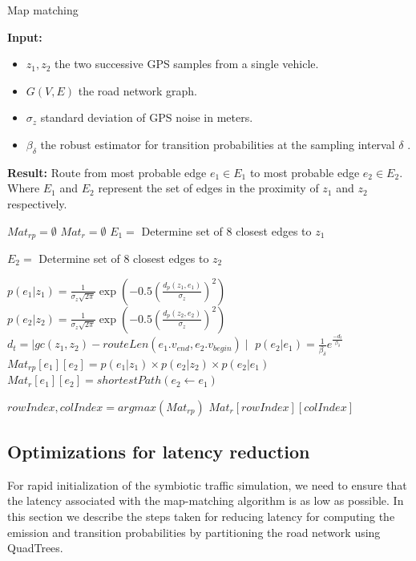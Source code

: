 \documentclass{wscpaperproc}
\theoremstyle{wsc}
\begin{document}
\begin{algorithm}[h]
\caption{Map matching}
\label{algo:map-matching-algo}
{\bf Input: }
\begin{itemize}
\item $z_{1},z_{2}$ the two successive GPS samples from a single vehicle.
\item $G(V,E)$ the road network graph.
\item $\sigma_{z}$ standard deviation of GPS noise in meters.
\item $\beta_{\delta}$ the robust estimator for transition probabilities at the sampling interval $\delta$ .

\end{itemize}
{\bf Result: }Route from most probable edge $e_{1}\in E_{1}$ to most probable edge $e_{2}\in E_{2}$. Where $E_{1}$ and $E_{2}$ represent the set of edges in the proximity of $z_{1}$ and $z_{2}$ respectively.
\begin{algorithmic}[1]
\State $Mat_{rp}=\emptyset$
\State $Mat_{r}=\emptyset$
\State $E_{1}=$ Determine set of 8 closest edges to $z_{1}$

\State $E_{2}=$ Determine set of 8 closest edges to $z_{2}$


	\State $p(e_{1}|z_{1}) = \frac{1}{\sigma_{z}\sqrt{2\pi}}\exp(-0.5(\frac{d_{p}(z_{1},e_{1})}{\sigma_{z}})^2)$
		\State $p(e_{2}|z_{2}) = \frac{1}{\sigma_{z}\sqrt{2\pi}}\exp(-0.5(\frac{d_{p}(z_{2},e_{2})}{\sigma_{z}})^2)$
		\State $d_{t} = \mid gc(z_{1},z_{2}) - routeLen(e_{1}.v_{end},e_{2}.v_{begin})\mid$
		\State $p(e_{2}|e_{1})=\frac{1}{\beta_{\delta}}e^\frac{-d_{t}}{\beta_{\delta}}$
		\State $Mat_{rp}[e_{1}][e_{2}]=p(e_{1}|z_{1})\times p(e_{2}|z_{2})\times p(e_{2}|e_{1})$
		\State $Mat_{r}[e_{1}][e_{2}]=shortestPath(e_{2}\gets e_{1})$
	\EndFor
	\EndFor
	
\State  $rowIndex,colIndex=argmax(Mat_{rp})$
$Mat_{r}[rowIndex][colIndex]$
	
\end{algorithmic}
\end{algorithm}





\subsection{Optimizations for latency reduction}
\label{subsec:optimizations}
For rapid initialization of the symbiotic traffic simulation, we need to ensure that the latency associated with the map-matching algorithm is as low as possible. In this section we describe the steps taken for reducing latency for computing the emission and transition probabilities by partitioning the road network using QuadTrees.
\end{document}
